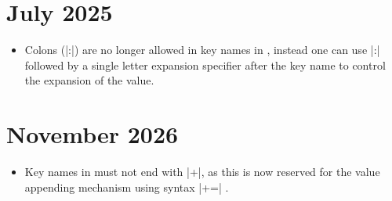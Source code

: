 \documentclass{l3doc}
\begin{document}
\section{July 2025}

\begin{itemize}
  \item Colons (|:|) are no longer allowed in key names in ,
    instead one can use |:| followed by a single letter expansion specifier
    after the key name to control the expansion of the value.
\end{itemize}

\section{November 2026}

\begin{itemize}
  \item Key names in  must not end with |+|, as this is now
    reserved for the value appending mechanism using syntax  |+=|
    .
\end{itemize}
\end{document}
